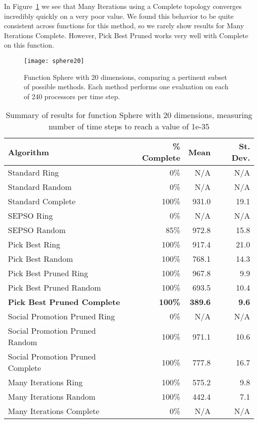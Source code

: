 \documentclass[smallcondensed]{svjour3}
\newcommand{\fig}[1]{Figure~\ref{fig:#1}}
\begin{document}
In \fig{sphere-20} we see that Many Iterations using a Complete topology
converges incredibly quickly on a very poor value.  We found this behavior to
be quite consistent across functions for this method, so we rarely show results
for Many Iterations Complete.  However, Pick Best Pruned works very well with
Complete on this function.

\begin{figure}
  \centering
  \texttt{[image: sphere20]}
  \caption{Function Sphere with 20 dimensions, comparing a pertinent subset of
  possible methods.  Each method performs one evaluation on each of 240
  processors per time step.}
  \label{fig:sphere-20}
\end{figure}

\begin{table}
  \caption{Summary of results for function Sphere with 20 dimensions,
  measuring number of time steps to reach a value of 1e-35}
  \label{tab:sphere-20}
  \centering
  \begin{tabular}{|l|r|r|r|}
  \hline
  Algorithm&\% Complete&Mean&St. Dev.\\
  \hline
  \hline
  Standard Ring&0\%&N/A&N/A\\
  \hline
  Standard Random&0\%&N/A&N/A\\
  \hline
  Standard Complete&100\%&931.0&19.1\\
  \hline
  SEPSO Ring&0\%&N/A&N/A\\
  \hline
  SEPSO Random&85\%&972.8&15.8\\
  \hline
  Pick Best Ring&100\%&917.4&21.0\\
  \hline
  Pick Best Random&100\%&768.1&14.3\\
  \hline
  Pick Best Pruned Ring&100\%&967.8&9.9\\
  \hline
  Pick Best Pruned Random&100\%&693.5&10.4\\
  \hline
  \textbf{Pick Best Pruned Complete}&\textbf{100\%}&\textbf{389.6}&
    \textbf{9.6}\\
  \hline
  Social Promotion Pruned Ring&0\%&N/A&N/A\\
  \hline
  Social Promotion Pruned Random&100\%&971.1&10.6\\
  \hline
  Social Promotion Pruned Complete&100\%&777.8&16.7\\
  \hline
  Many Iterations Ring&100\%&575.2&9.8\\
  \hline
  Many Iterations Random&100\%&442.4&7.1\\
  \hline
  Many Iterations Complete&0\%&N/A&N/A\\
  \hline
  \end{tabular}
\end{table}
\end{document}
